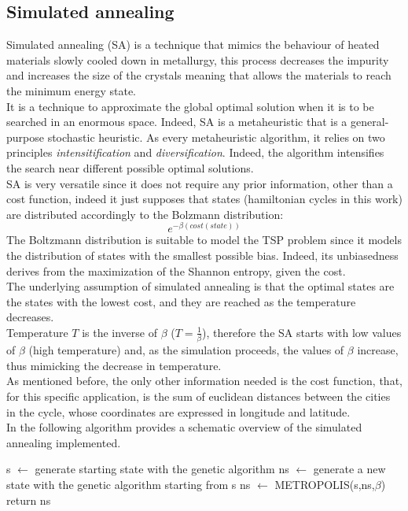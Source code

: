 \documentclass{article}
\begin{document}
\subsection{Simulated annealing}
Simulated annealing (SA) is a technique that mimics the behaviour of heated materials slowly cooled down in metallurgy, this process decreases the impurity and increases the size of the crystals meaning that allows the materials to reach the minimum energy state. \\
It is a technique to approximate the global optimal solution when it is to be searched in an enormous space. Indeed, SA is a metaheuristic that is a general-purpose stochastic heuristic. As every metaheuristic algorithm, it relies on two principles \textit{intensitification} and \textit{diversification}. Indeed, the algorithm intensifies the search near different possible optimal solutions.\\
SA is very versatile since it does not require any prior information, other than a cost function, indeed it just supposes that states (hamiltonian cycles in this work) are distributed accordingly to the Bolzmann distribution:
\begin{equation}
e^{- \beta (cost(state))}
\end{equation}
The Boltzmann distribution is suitable to model the TSP problem since it models the distribution of states with the smallest possible bias. Indeed, its unbiasedness derives from the maximization of the Shannon entropy, given the cost.\\
The underlying assumption of simulated annealing is that the optimal states are the states with the lowest cost, and they are reached as the temperature decreases.\\
Temperature $T$ is the inverse of $\beta$ ($T = \frac{1}{\beta}$), therefore the SA starts with low values of $\beta$ (high temperature) and, as the simulation proceeds, the values of $\beta$  increase, thus mimicking the decrease in temperature. \\
As mentioned before, the only other information needed is the cost function, that, for this specific application, is the sum of euclidean distances between the cities in the cycle, whose coordinates are expressed in longitude and latitude.\\
In the following algorithm provides a schematic overview of the simulated annealing implemented.

\begin{algorithm}[H]
    \begin{algorithmic}[1]
        \State s $\leftarrow$ generate starting state with the genetic algorithm
         	 \State ns $\leftarrow$ generate a new state with the genetic algorithm starting from s
         	\State ns $\leftarrow$ METROPOLIS(s,ns,$\beta$)
         	\EndFor
        \EndFor
        \State return ns
       \EndFunction
\end{algorithmic}
\end{algorithm}
\end{document}
